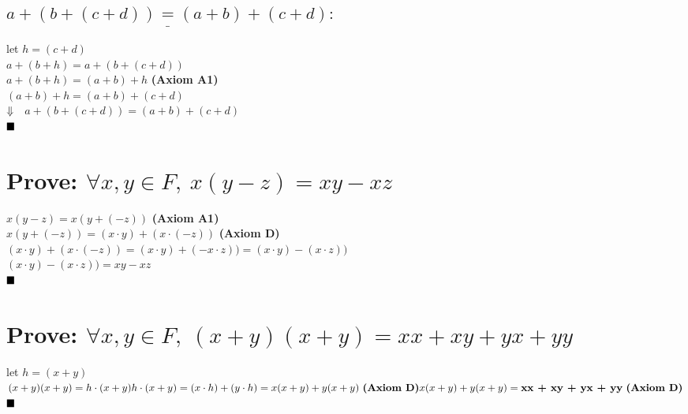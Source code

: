 \documentclass[a4paper, 12pt]{article}
\newcommand{\qed}{\\\ensuremath{\\\blacksquare\pagebreak}}
\renewcommand{\b}[1]{\textbf{#1}}
\newcommand{\axiom}[1]{~\b{(Axiom #1)}}
\renewcommand{\d}{\\\ensuremath{\Downarrow\\~}}
\begin{document}
\subsection{$ \underline{ a+(b+(c+d))=(a+b)+(c+d) }: $}
let $h=(c+d)$\\
$ a+(b+h) = a+(b+(c+d)) $\\
$ a+(b+h) = (a+b)+h $ \textbf{(Axiom A1)}\\
$ (a+b)+h = (a+b)+(c+d) $
\d
$ a+(b+(c+d)) = (a+b)+(c+d) $
\qed

\section{Prove: $ \forall{x,y}\in{F},~x(y-z) = xy-xz $}
$ x(y-z) = x(y+(-z)) $ \textbf{(Axiom A1)}\\
$ x(y+(-z)) = (x\cdot{y})+(x\cdot(-z))$ \textbf{(Axiom D)}\\
$ (x\cdot{y})+(x\cdot(-z)) = (x\cdot{y})+(-x\cdot{z})) = (x\cdot{y})-(x\cdot{z})) $\\
$ (x\cdot{y})-(x\cdot{z})) = xy - xz $
\qed

\section{Prove: $ \forall{x,y}\in{F},~ (x+y)(x+y) = xx + xy + yx + yy $}
let $ h=(x+y) $\\
$
    (x+y)(x+y) = h\cdot(x+y)\\
    h\cdot(x+y) = (x\cdot{h})+(y\cdot{h}) = x(x+y) + y(x+y) \axiom{D}\\
    x(x+y) + y(x+y) = \b{xx + xy + yx + yy} \axiom{D}
$
\qed
\end{document}

